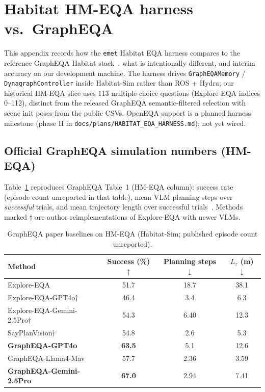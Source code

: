 \section{Habitat HM-EQA harness vs.\ GraphEQA}
\label{app:habitat_eqa_parity}

This appendix records how the \texttt{emet} Habitat EQA harness compares to the reference GraphEQA Habitat stack~\citep{saxena2024grapheqa}, what is intentionally different, and interim accuracy on our development machine.
The harness drives \texttt{GraphEQAMemory} / \texttt{DynagraphController} inside Habitat-Sim rather than ROS + Hydra; our historical HM-EQA slice uses 113 multiple-choice questions (Explore-EQA indices 0--112), distinct from the released GraphEQA semantic-filtered selection with scene init poses from the public CSVs.
OpenEQA support is a planned harness milestone (phase H in \texttt{docs/plans/HABITAT\_EQA\_HARNESS.md}); not yet wired.

\subsection{Official GraphEQA simulation numbers (HM-EQA)}

Table~\ref{tab:grapheqa_official_hmeqa} reproduces GraphEQA Table~1 (HM-EQA column): success rate (episode count unreported in that table), mean VLM planning steps over \emph{successful} trials, and mean trajectory length over successful trials~\citep{saxena2024grapheqa}.
Methods marked $\dagger$ are author reimplementations of Explore-EQA with newer VLMs.

\begin{table}[t]
  \centering
  \caption{GraphEQA paper baselines on HM-EQA (Habitat-Sim; published episode count unreported).}
  \label{tab:grapheqa_official_hmeqa}
  \small
  \begin{tabular}{@{}lccc@{}}
    \toprule
    Method & Success (\%) $\uparrow$ & Planning steps $\downarrow$ & $L_\tau$ (m) $\downarrow$ \\
    \midrule
    Explore-EQA~\citep{ren2024exploreeqa} & 51.7 & 18.7 & 38.1 \\
    Explore-EQA-GPT4o$\dagger$ & 46.4 & 3.4 & 6.3 \\
    Explore-EQA-Gemini-2.5Pro$\dagger$ & 54.3 & 6.40 & 12.3 \\
    SayPlanVision$\dagger$ & 54.8 & 2.6 & 5.3 \\
    \textbf{GraphEQA-GPT4o} & \textbf{63.5} & 5.1 & 12.6 \\
    GraphEQA-Llama4-Mav & 57.7 & 2.36 & 3.59 \\
    \textbf{GraphEQA-Gemini-2.5Pro} & \textbf{67.0} & 2.94 & 7.41 \\
    \bottomrule
  \end{tabular}
\end{table}

